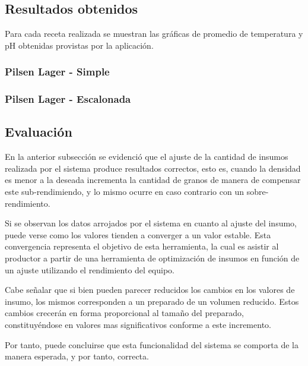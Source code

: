     \subsection{Resultados obtenidos}
        \par Para cada receta realizada se muestran las gráficas de promedio de temperatura y pH obtenidas provistas por la aplicación.
        
        \subsubsection{Pilsen Lager - Simple}
        
        \subsubsection{Pilsen Lager - Escalonada}
            
    \subsection{Evaluación}
    \par En la anterior subsección se evidenció que el ajuste de la cantidad de insumos realizada por el sistema produce resultados correctos, esto es, cuando la densidad es menor a la deseada incrementa la cantidad de granos de manera de compensar este sub-rendimiendo, y lo mismo ocurre en caso contrario con un sobre-rendimiento.
    \par  Si se observan los datos arrojados por el sistema en cuanto al ajuste del insumo, puede verse como los valores tienden a converger a un valor estable. Esta convergencia representa el objetivo de esta herramienta, la cual es asistir al productor a partir de una herramienta de optimización de insumos en función de un ajuste utilizando el rendimiento del equipo.
    \par Cabe señalar que si bien pueden parecer reducidos los cambios en los valores de insumo, los mismos corresponden a un preparado de un volumen reducido. Estos cambios crecerán en forma proporcional al tamaño del preparado, constituyéndose en valores mas significativos conforme a este incremento.
    \par Por tanto, puede concluirse que esta funcionalidad del sistema se comporta de la manera esperada, y por tanto, correcta. 
    
    
        
        
